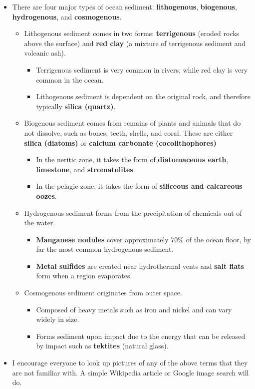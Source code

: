 \documentclass{article}
\begin{document}
\begin{itemize}
	\item There are four major types of ocean sediment: \textbf{lithogenous}, \textbf{biogenous}, \textbf{hydrogenous}, and \textbf{cosmogenous}.
	\begin{itemize}
		\item Lithogenous sediment comes in two forms: \textbf{terrigenous} (eroded rocks above the surface) and \textbf{red clay} (a mixture of terrigenous sediment and volcanic ash). 
		\begin{itemize}
			\item Terrigenous sediment is very common in rivers, while red clay is very common in the ocean. 
			\item Lithogenous sediment is dependent on the original rock, and therefore typically \textbf{silica (quartz)}.
		\end{itemize}		 
		\item Biogenous sediment comes from remains of plants and animals that do not dissolve, such as bones, teeth, shells, and coral. These are either \textbf{silica (diatoms)} or \textbf{calcium carbonate (cocolithophores)}
		\begin{itemize}
			\item In the neritic zone, it takes the form of \textbf{diatomaceous earth}, \textbf{limestone}, and \textbf{stromatolites}.
			\item In the pelagic zone, it takes the form of \textbf{siliceous and calcareous oozes}.
		\end{itemize}
		\item Hydrogenous sediment forms from the precipitation of chemicals out of the water.
		\begin{itemize}
			\item \textbf{Manganese nodules} cover approximately 70\% of the ocean floor, by far the most common hydrogenous sediment.
			\item \textbf{Metal sulfides} are created near hydrothermal vents and \textbf{salt flats} form when a region evaporates.
			\end{itemize}
		\item Cosmogenous sediment originates from outer space.
		\begin{itemize}
			\item Composed of heavy metals such as iron and nickel and can vary widely in size.
			\item Forms sediment upon impact due to the energy that can be released by impact such as \textbf{tektites} (natural glass). 
		\end{itemize}
	\end{itemize}
	
	\item I encourage everyone to look up pictures of any of the above terms that they are not familiar with. A simple Wikipedia article or Google image search will do.
	
\end{itemize}
\end{document}
